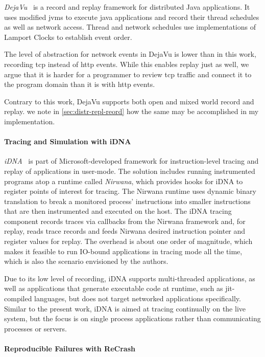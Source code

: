 \emph{DejaVu}~\cite{Konuru2000} is a record and replay framework for
distributed Java applications. It uses modified \acp{jvm} to execute
java applications and record their thread schedules as well as network
access. Thread and network schedules use implementations of Lamport
Clocks to establish event order.

The level of abstraction for network events in DejaVu is lower than in
this work, recording \ac{tcp} instead of \ac{http} events. While this
enables replay just as well, we argue that it is harder for a
programmer to review \ac{tcp} traffic and connect it to the program
domain than it is with \ac{http} events.

Contrary to this work, DejaVu supports both open and mixed world
record and replay. we note in \autoref{sec:distr-repl-reord} how the
same may be accomplished in my implementation.

\paragraph{Tracing and Simulation with iDNA}
\label{sec:idna}

\emph{iDNA}~\cite{Bhansali2006} is part of Microsoft-developed
framework for instruction-level tracing and replay of applications in
user-mode. The solution includes running instrumented programs atop a
runtime called \emph{Nirwana}, which provides hooks for iDNA to
register points of interest for tracing. The Nirwana runtime uses
dynamic binary translation to break a monitored process' instructions
into smaller instructions that are then instrumented and executed on
the host. The iDNA tracing component records traces via callbacks from
the Nirwana framework and, for replay, reads trace records and feeds
Nirwana desired instruction pointer and register values for
replay. The overhead is about one order of magnitude, which makes it
feasible to run IO-bound applications in tracing mode all the time,
which is also the scenario envisioned by the authors.

Due to its low level of recording, iDNA supports multi-threaded
applications, as well as applications that generate executable code at
runtime, such as \ac{jit}-compiled languages, but does not target networked
applications specifically. Similar to the present work, iDNA is aimed
at tracing continually on the live system, but the focus is on single
process applications rather than communicating processes or servers.

\paragraph{Reproducible Failures with ReCrash}
\label{sec:recrash}


